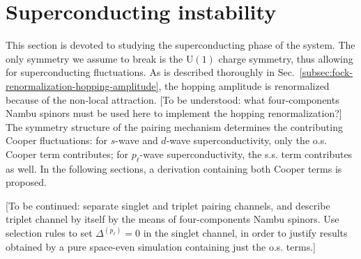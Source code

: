 
\section{Superconducting instability}

This section is devoted to studying the superconducting phase of the system. The only symmetry we assume to break is the $\mathrm{U}(1)$ charge symmetry, thus allowing for superconducting fluctuations. 
{\color{tabred}
	As is described thoroughly in Sec.~\ref{subsec:fock-renormalization-hopping-amplitude}, the hopping amplitude is renormalized because of the non-local attraction. [To be understood: what four-components Nambu spinors must be used here to implement the hopping renormalization?]
}
The symmetry structure of the pairing mechanism determines the contributing Cooper fluctuations: for $s$-wave and $d$-wave superconductivity, only the o.s. Cooper term contributes; for $p_\ell$-wave superconductivity, the s.s. term contributes as well. In the following sections, a derivation containing both Cooper terms is proposed.

{\color{tabred}
	[To be continued: separate singlet and triplet pairing channels, and describe triplet channel by itself by the means of four-components Nambu spinors. Use selection rules to set $\Delta^{(p_\ell)}=0$ in the singlet channel, in order to justify results obtained by a pure space-even simulation containing just the o.s. terms.]
}

